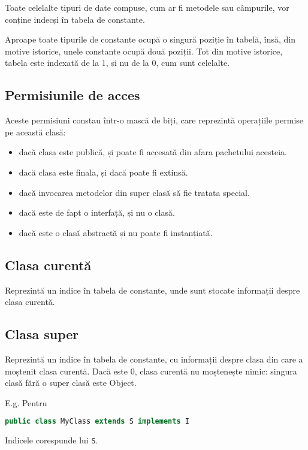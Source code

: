 Toate celelalte tipuri de date compuse, cum ar fi metodele sau
câmpurile, vor conține indecși în tabela de constante.

Aproape toate tipurile de constante ocupă o singură poziție în tabelă, însă, din
motive istorice, unele constante ocupă două poziții.
Tot din motive istorice, tabela este indexată de la 1, și nu
de la 0, cum sunt celelalte.

\subsection{Permisiunile de acces}

Aceste permisiuni constau într-o mască de biți, care reprezintă
operațiile permise pe această clasă:

\begin{itemize}
	\item dacă clasa este publică, și poate fi accesată din afara pachetului acesteia.
	\item dacă clasa este finala, și dacă poate fi extinsă.
	\item dacă invocarea metodelor din super clasă să fie tratata special.
	\item dacă este de fapt o interfață, și nu o clasă.
	\item dacă este o clasă abstractă și nu poate fi instanțiată.
\end{itemize}

\subsection{Clasa curentă}

Reprezintă un indice în tabela de constante, unde sunt stocate
informații despre clasa curentă.

\subsection{Clasa super}

Reprezintă un indice în tabela de constante, cu informații despre clasa
din care a moștenit clasa curentă. Dacă este 0, clasa
curentă nu moștenește nimic: singura clasă fără o super clasă este
Object.

E.g. Pentru

\begin{lstlisting}[language=Java]
public class MyClass extends S implements I
\end{lstlisting}

Indicele corespunde lui \texttt{S}.

